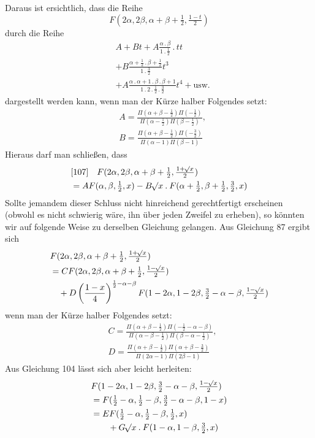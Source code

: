 Daraus ist ersichtlich, dass die Reihe
\[
F(2\alpha,2\beta,\alpha+\beta+\tfrac12,\tfrac{1-t}2)
\]
durch die Reihe
\[
\begin{aligned}&A+Bt+A\frac{\alpha\mathbin{.}\beta}{1\mathbin{.}\tfrac12}\mathbin{.}tt\\&+B\frac{\alpha+\tfrac12\mathbin{.}\beta+\tfrac12}{1\mathbin{.}\tfrac32}t^3\\&+A\frac{\alpha\mathbin{.}\alpha+1\mathbin{.}\beta\mathbin{.}\beta+1}{1\mathbin{.}2\mathbin{.}\tfrac12\mathbin{.}\tfrac32}t^4+\text{usw.}\end{aligned}
\]
dargestellt werden kann, wenn man der Kürze halber Folgendes setzt:
\[
\begin{aligned}&A=\frac{\Pi(\alpha+\beta-\tfrac12)\Pi(-\tfrac12)}{\Pi(\alpha-\tfrac12)\Pi(\beta-\tfrac12)},\\&
B=\frac{\Pi(\alpha+\beta-\tfrac12)\Pi(-\tfrac32)}{\Pi(\alpha-1)\Pi(\beta-1)}\end{aligned}
\]
Hieraus darf man schließen, dass
\[
\begin{aligned}&[107]\quad F(2\alpha,2\beta,\alpha+\beta+\tfrac12,\tfrac{1+\mathord{{}^{}\!\surd}x}2)\\&=AF(\alpha,\beta,\tfrac12,x)-B\mathord{{}^{}\!\surd}x\mathbin{.}F(\alpha+\tfrac12,\beta+\tfrac12,\tfrac32,x)\end{aligned}
\]
Sollte jemandem dieser Schluss nicht hinreichend gerechtfertigt erscheinen (obwohl es nicht schwierig wäre, ihn über jeden Zweifel zu erheben), so könnten wir auf folgende Weise zu derselben Gleichung gelangen. Aus Gleichung 87 ergibt sich
\[
\begin{aligned}
&F(2\alpha,2\beta,\alpha+\beta+\tfrac12,\tfrac{1+\mathord{{}^{}\!\surd}x}2)\\&=CF(2\alpha,2\beta,\alpha+\beta+\tfrac12,\tfrac{1-\mathord{{}^{}\!\surd}x}2)\\
&\quad+D\left(\frac{1-x}4\right)^{\frac12-\alpha-\beta}F(1-2\alpha,1-2\beta,\tfrac32-\alpha-\beta,\tfrac{1-\mathord{{}^{}\!\surd}x}2)
\end{aligned}
\]
wenn man der Kürze halber Folgendes setzt:
\[
\begin{aligned}&C=\frac{\Pi(\alpha+\beta-\tfrac12)\Pi(-\tfrac12-\alpha-\beta)}{\Pi(\alpha-\beta-\tfrac12)\Pi(\beta-\alpha-\tfrac12)},\\&
D=\frac{\Pi(\alpha+\beta-\tfrac12)\Pi(\alpha+\beta-\tfrac32)}{\Pi(2\alpha-1)\Pi(2\beta-1)}\end{aligned}
\]
Aus Gleichung 104 lässt sich aber leicht herleiten:
\[
\begin{aligned}
&F(1-2\alpha,1-2\beta,\tfrac32-\alpha-\beta,\tfrac{1-\mathord{{}^{}\!\surd}x}2)\\&=F(\tfrac12-\alpha,\tfrac12-\beta,\tfrac32-\alpha-\beta,1-x)\\
&=EF(\tfrac12-\alpha,\tfrac12-\beta,\tfrac12,x)\\&\qquad+G\mathord{{}^{}\!\surd}x\mathbin{.}F(1-\alpha,1-\beta,\tfrac32,x)
\end{aligned}
\]
